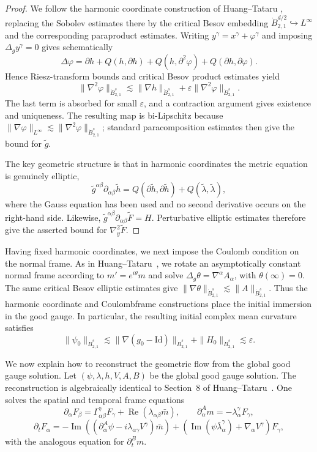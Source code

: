\documentclass[11pt,letterpaper,reqno]{amsart}
\numberwithin{equation}{section}
\theoremstyle{definition}
\theoremstyle{remark}
\begin{document}
\begin{proof}
We follow the harmonic coordinate construction of Huang--Tataru \cite[Proposition~8.2]{HT22}, replacing the Sobolev estimates there by the critical Besov embedding
$\dot {B}^{d/2}_{2,1}\hookrightarrow L^\infty$ and the corresponding paraproduct estimates. Writing $y^\gamma=x^\gamma+\varphi^\gamma$ and imposing $\Delta_g y^\gamma=0$ gives schematically
\[
 \Delta\varphi=\partial h+Q(h,\partial h)+Q(h,\partial^2\varphi)
      +Q(\partial h,\partial\varphi).
\]
Hence Riesz-transform bounds and critical Besov product estimates yield
\[
 \|\nabla^2\varphi\|_{\dot {B}^s_{2,1}}
 \lesssim \|\nabla h\|_{\dot {B}^s_{2,1}}
 +\varepsilon\|\nabla^2\varphi\|_{\dot {B}^s_{2,1}}.
\]
The last term is absorbed for small $\varepsilon$, and a contraction argument gives existence and uniqueness. The resulting map is bi-Lipschitz because
$\|\nabla\varphi\|_{L^\infty}\lesssim\|\nabla^2\varphi\|_{\dot {B}^s_{2,1}}$; standard paracomposition estimates then give the bound for $\widetilde g$.

The key geometric structure is that in harmonic coordinates the metric equation is genuinely elliptic,
\[
 \widetilde g^{\alpha\beta}\partial_{\alpha\beta}\widetilde h
   =Q(\partial\widetilde h,\partial\widetilde h)+Q(\widetilde\lambda,\widetilde\lambda),
\]
where the Gauss equation has been used and no second derivative occurs on the right-hand side. Likewise,
$\widetilde g^{\alpha\beta}\partial_{\alpha\beta}\widetilde F=H$.
Perturbative elliptic estimates therefore give the asserted bound for $\nabla_y^2\widetilde F$.
\end{proof}

Having fixed harmonic coordinates, we next impose the Coulomb condition on
the normal frame. As in Huang--Tataru~\cite{HT22}, we rotate an
asymptotically constant normal frame according to $m'=e^{i\theta}m$ and solve
$\Delta_g\theta=\nabla^\alpha A_\alpha$, with $\theta(\infty)=0$. The same critical Besov elliptic estimates give
$\|\nabla\theta\|_{\dot {B}^s_{2,1}}\lesssim\|A\|_{\dot {B}^s_{2,1}}$.
Thus the harmonic coordinate and Coulombframe constructions place the
initial immersion in the good gauge. In particular, the resulting initial
complex mean curvature satisfies
\[
\|\psi_0\|_{\dot B^s_{2,1}}
\lesssim
\|\nabla(g_0-\mathrm{Id})\|_{\dot B^s_{2,1}}
+
\|H_0\|_{\dot B^s_{2,1}}
\lesssim
\varepsilon.
\]

We now explain how to reconstruct the geometric flow from the global
good gauge solution. 
Let $(\psi,\lambda,h,V,A,B)$ be the global good gauge solution. The reconstruction is algebraically identical to Section~8 of Huang--Tataru~\cite{HT22}. One solves the spatial and temporal frame equations
\[
 \partial_\alpha F_\beta
 =\Gamma^\gamma_{\alpha\beta}F_\gamma
   +\operatorname{Re}(\lambda_{\alpha\beta}\bar m),
 \qquad
 \partial_\alpha^A m=-\lambda_\alpha^{\gamma}F_\gamma,
\]
\[
 \partial_tF_\alpha
 =-\operatorname{Im}\!\left((\partial_\alpha^A\psi-i\lambda_{\alpha\gamma}V^\gamma)\bar m\right)
 +\left(\operatorname{Im}(\psi\bar\lambda_\alpha^{\gamma})+\nabla_\alpha V^\gamma\right)F_\gamma,
\]
with the analogous equation for $\partial_t^B m$.
 
\end{document}
